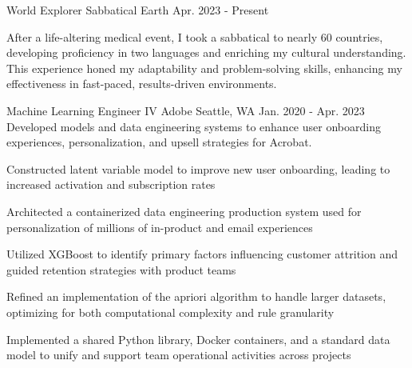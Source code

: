 
%
% 
% 
%
%
%
%
%
% 

\begin{cventries}

\cventry
    {World Explorer} %
    {Sabbatical} %
    {Earth} %
    {Apr. 2023 - Present} %
    {\parbox[t]{\linewidth}{After a life-altering medical event, I took a sabbatical to nearly 60 countries, developing proficiency in two languages and enriching my cultural understanding. This experience honed my adaptability and problem-solving skills, enhancing my effectiveness in fast-paced, results-driven environments.}} %
    {}

\cventry
    {Machine Learning Engineer IV} %
    {Adobe} %
    {Seattle, WA} %
    {Jan. 2020 - Apr. 2023} %
    {Developed models and data engineering systems to enhance user onboarding experiences, personalization, and upsell strategies for Acrobat.} %
    {
      \begin{cvitems} %
        \item {Constructed latent variable model to improve new user onboarding, leading to increased activation and subscription rates}
        \item {Architected a containerized data engineering production system used for personalization of millions of in-product and email experiences}
        \item {Utilized XGBoost to identify primary factors influencing customer attrition and guided retention strategies with product teams}
        \item {Refined an implementation of the apriori algorithm to handle larger datasets, optimizing for both computational complexity and rule granularity}
        \item {Implemented a shared Python library, Docker containers, and a standard data model to unify and support team operational activities across projects}
      \end{cvitems}
    }


\end{cventries}
